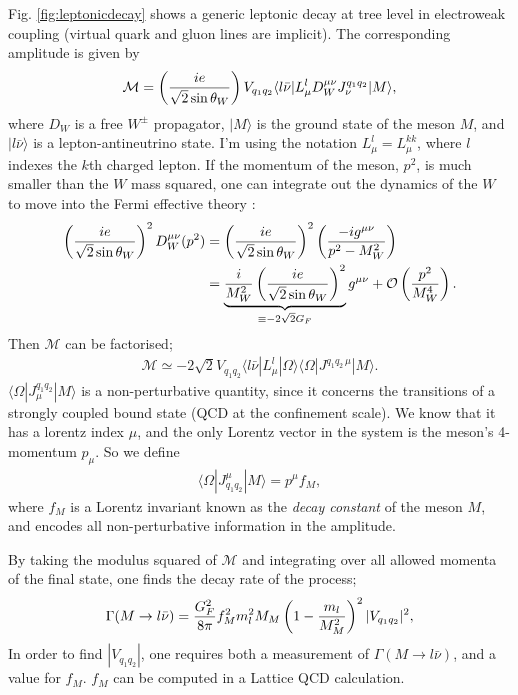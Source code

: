 Fig. \ref{fig:leptonicdecay} shows a generic leptonic decay at tree level in electroweak coupling (virtual quark and gluon lines are implicit). The corresponding amplitude is given by
\begin{align}
  \mathcal{M} = \left({ie\over \sqrt{2}\sin\theta_W}\right) V_{q_1q_2} \langle l\bar{\nu} | L^l_{\mu} D_W^{\mu\nu} J_{\nu}^{q_1q_2} | M \rangle,
\end{align}
where $D_{W}$ is a free $W^{\pm}$ propagator, $|M\rangle$ is the ground state of the meson $M$, and $|l\bar{\nu}\rangle$ is a lepton-antineutrino state. I'm using the notation $L^l_{\mu}=L^{kk}_{\mu}$, where $l$ indexes the $k$th charged lepton. If the momentum of the meson, $p^2$, is much smaller than the $W$ mass squared, one can integrate out the dynamics of the $W$ to move into the Fermi effective theory \cite{Borasoy:2007yi}:
\begin{align}
  \nonumber
  \left({ie\over\sqrt{2}\sin\theta_W}\right)^2 D^{\mu\nu}_W(p^2) &= \left({ie\over\sqrt{2}\sin\theta_W}\right)^2 \left( -ig^{\mu\nu} \over p^2 - M_W^2 \right)
  \\ & = \underbrace{ {i\over M_W^2} \left( ie \over \sqrt{2}\sin\theta_W \right)^2  }_{\equiv -2\sqrt{2}G_F} g^{\mu\nu} + \mathcal{O}\left({p^2\over M_W^4}\right).
\end{align}
Then $\mathcal{M}$ can be factorised;
\begin{align}
  \mathcal{M} \simeq -2\sqrt{2} V_{q_1q_2} \langle l\bar{\nu} | L_{\mu}^l | \Omega \rangle \langle \Omega | J^{q_1q_2\, \mu} | M \rangle.
\end{align}
$\langle \Omega | J^{q_1q_2}_{\mu}| M \rangle$ is a non-perturbative quantity, since it concerns the transitions of a strongly coupled bound state (QCD at the confinement scale). We know that it has a lorentz index $\mu$, and the only Lorentz vector in the system is the meson's 4-momentum $p_{\mu}$. So we define
\begin{align}
  \langle\Omega | J_{q_1q_2}^{\mu} | M \rangle = p^{\mu} f_M,
  \label{eq:decay_constant_def}
\end{align}
where $f_M$ is a Lorentz invariant known as the {\it{decay constant}} of the meson $M$, and encodes all non-perturbative information in the amplitude.

By taking the modulus squared of $\mathcal{M}$ and integrating over all allowed momenta of the final state, one finds the decay rate of the process;
\begin{align}
  \Gamma(M\to l\bar{\nu}) = {G_F^2\over 8\pi} f_M^2 m_l^2 M_M \left( 1 - {m_l\over M_M^2} \right)^2 |V_{q_1q_2}|^2,
\end{align}
In order to find $|V_{q_1q_2}|$, one requires both a measurement of $\Gamma(M\to l\bar{\nu})$, and a value for $f_M$. $f_M$ can be computed in a Lattice QCD calculation.

